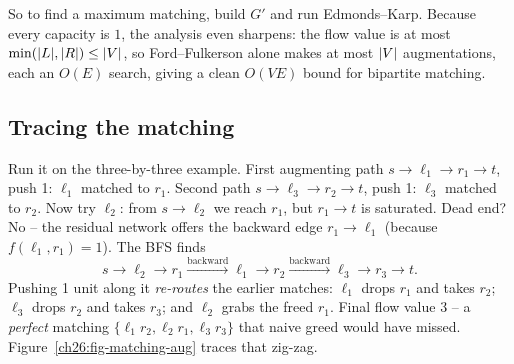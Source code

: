 So to find a maximum matching, build $G'$ and run Edmonds--Karp. Because every
capacity is $1$, the analysis even sharpens: the flow value is at most
$\min(\lvert L\rvert,\lvert R\rvert) \le \lvert V\rvert$, so Ford--Fulkerson alone makes at most
$\lvert V\rvert$ augmentations, each an $O(E)$ search, giving a clean $O(VE)$ bound for
bipartite matching.

\subsection{Tracing the matching}

Run it on the three-by-three example. First augmenting path $s\to\ell_1\to r_1
\to t$, push 1: $\ell_1$ matched to $r_1$. Second path $s\to\ell_3\to r_2\to t$,
push 1: $\ell_3$ matched to $r_2$. Now try $\ell_2$: from $s\to\ell_2$ we reach
$r_1$, but $r_1\to t$ is saturated. Dead end? No -- the residual network offers
the backward edge $r_1\to\ell_1$ (because $f(\ell_1,r_1)=1$). The BFS finds
\[
  s \to \ell_2 \to r_1 \xrightarrow{\text{backward}} \ell_1 \to r_2
      \xrightarrow{\text{backward}} \ell_3 \to r_3 \to t.
\]
Pushing 1 unit along it \emph{re-routes} the earlier matches: $\ell_1$ drops
$r_1$ and takes $r_2$; $\ell_3$ drops $r_2$ and takes $r_3$; and $\ell_2$ grabs
the freed $r_1$. Final flow value $3$ -- a \emph{perfect} matching
$\{\ell_1 r_2, \ell_2 r_1, \ell_3 r_3\}$ that naive greed would have missed.
Figure~\ref{ch26:fig-matching-aug} traces that zig-zag.

